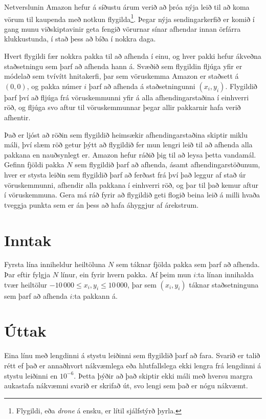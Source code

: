 

Netverslunin Amazon hefur á síðustu árum verið að þróa nýja leið til að
koma vörum til kaupenda með notkun flygilda\footnote{Flygildi, eða \emph{drone}
á ensku, er lítil sjálfstýrð þyrla.}. Þegar nýja sendingarkerfið er komið í
gang munu viðskiptavinir geta fengið vörurnar sínar afhendar innan örfárra
klukkustunda, í stað þess að bíða í nokkra daga.

Hvert flygildi fær nokkra pakka til að afhenda í einu, og hver pakki hefur
ákveðna staðsetningu sem þarf að afhenda hann á. Svæðið sem flygildin fljúga
yfir er módelað sem tvívítt hnitakerfi, þar sem vöruskemma Amazon er staðsett á
$(0,0)$, og pakka númer $i$ þarf að afhenda á staðsetningunni $(x_i, y_i)$.
Flygildið þarf því að fljúga frá vöruskemmunni yfir á alla afhendingarstaðina í
einhverri röð, og fljúga svo aftur til vöruskemmunnar þegar allir pakkarnir
hafa verið afhentir.

Það er ljóst að röðin sem flygildið heimsækir afhendingarstaðina skiptir miklu
máli, því slæm röð getur þýtt að flygildið fer mun lengri leið til að afhenda
alla pakkana en nauðsynlegt er. Amazon hefur ráðið þig til að leysa þetta
vandamál. Gefinn fjöldi pakka $N$ sem flygildið þarf að afhenda, ásamt
afhendingarstöðunum, hver er stysta leiðin sem flygildið þarf að ferðast frá
því það leggur af stað úr vöruskemmunni, afhendir alla pakkana í einhverri röð,
og þar til það kemur aftur í vöruskemmuna. Gera má ráð fyrir að flygildið geti
flogið beina leið á milli hvaða tveggja punkta sem er án þess að hafa áhyggjur
af árekstrum.

\section*{Inntak}
Fyrsta lína inniheldur heiltöluna $N$ sem táknar fjölda pakka sem þarf að
afhenda. Þar eftir fylgja $N$ línur, ein fyrir hvern pakka. Af þeim mun $i$:ta
línan innihalda tvær heiltölur $-10\,000\leq x_i,y_i \leq 10\,000$, þar sem
$(x_i,y_i)$ táknar staðsetninguna sem þarf að afhenda $i$:ta pakkann á.

\section*{Úttak}
Eina línu með lengdinni á stystu leiðinni sem flygildið þarf að fara. Svarið er
talið rétt ef það er annaðhvort nákvæmlega eða hlutfallslega ekki lengra frá
lengdinni á stystu leiðinni en $10^{-6}$. Þetta þýðir að það skiptir ekki máli
með hversu margra aukastafa nákvæmni svarið er skrifað út, svo lengi sem það er
nógu nákvæmt.

